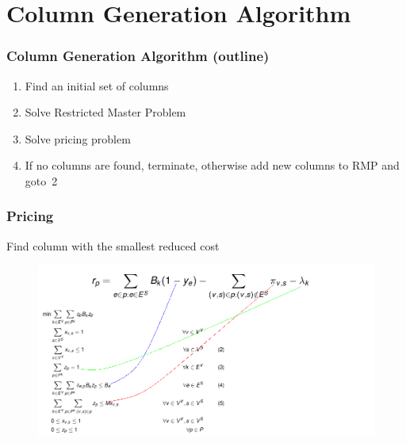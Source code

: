 \documentclass[english]{beamer}
\begin{document}
\section{Column Generation Algorithm}
\begin{frame}
  \frametitle{Column Generation Algorithm (outline)}
\begin{enumerate}
	\item Find an initial set of columns
	\item Solve Restricted Master Problem
	\item Solve pricing problem
	\item If no columns are found, terminate, otherwise add new columns to RMP and goto~2
\end{enumerate}
\end{frame}
\begin{frame}
\frametitle{Pricing}
  Find column with the smallest reduced cost

  \begin{figure}
    \centering
    \includegraphics[scale=0.4]{redcost1.png}
  \end{figure}

\end{frame}
\end{document}
